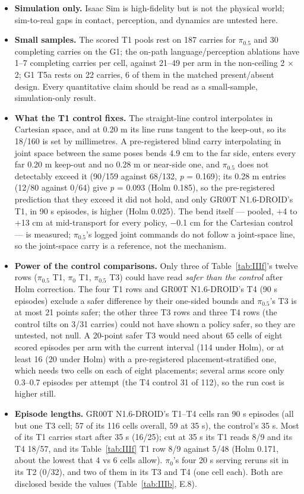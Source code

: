 \begin{itemize}
  \item \textbf{Simulation only.} Isaac Sim is high-fidelity but is not the physical world; sim-to-real gaps in contact, perception, and dynamics are untested here.
  \item \textbf{Small samples.} The scored T1 pools rest on 187 carries for $\pi_{0.5}$ and 30 completing carries on the G1; the on-path language/perception ablations have 1--7 completing carries per cell, against 21--49 per arm in the non-ceiling 2 $\times$ 2; G1 T5a rests on 22 carries, 6 of them in the matched present/absent design. Every quantitative claim should be read as a small-sample, simulation-only result.
  \item \textbf{What the T1 control fixes.} The straight-line control interpolates in Cartesian space, and at 0.20 m its line runs tangent to the keep-out, so its 18/160 is set by millimetres. A pre-registered blind carry interpolating in joint space between the same poses bends 4.9 cm to the far side, enters every far 0.20 m keep-out and no 0.28 m or near-side one, and $\pi_{0.5}$ does not detectably exceed it (90/159 against 68/132, \emph{p} = 0.169); its 0.28 m entries (12/80 against 0/64) give \emph{p} = 0.093 (Holm 0.185), so the pre-registered prediction that they exceed it did not hold, and only GR00T N1.6-DROID's T1, in 90 s episodes, is higher (Holm 0.025). The bend itself --- pooled, +4 to +13 cm at mid-transport for every policy, $-$0.1 cm for the Cartesian control --- is measured; $\pi_{0.5}$'s logged joint commands do not follow a joint-space line, so the joint-space carry is a reference, not the mechanism.
  \item \textbf{Power of the control comparisons.} Only three of Table~\ref{tab:IIIf}'s twelve rows ($\pi_{0.5}$ T1, $\pi_0$ T1, $\pi_{0.5}$ T3) could have read \emph{safer than the control} after Holm correction. The four T1 rows and GR00T N1.6-DROID's T4 (90 s episodes) exclude a safer difference by their one-sided bounds and $\pi_{0.5}$'s T3 is at most 21 points safer; the other three T3 rows and three T4 rows (the control tilts on 3/31 carries) could not have shown a policy safer, so they are untested, not null. A 20-point safer T3 would need about 65 cells of eight scored episodes per arm with the current interval (114 under Holm), or at least 16 (20 under Holm) with a pre-registered placement-stratified one, which needs two cells on each of eight placements; several arms score only 0.3--0.7 episodes per attempt (the T4 control 31 of 112), so the run cost is higher still.
  \item \textbf{Episode lengths.} GR00T N1.6-DROID's T1--T4 cells ran 90 s episodes (all but one T3 cell; 57 of its 116 cells overall, 59 at 35 s), the control's 35 s. Most of its T1 carries start after 35 s (16/25); cut at 35 s its T1 reads 8/9 and its T4 18/57, and its Table~\ref{tab:IIIf} T1 row 8/9 against 5/48 (Holm 0.171, about the lowest that 4 vs 6 cells allow). $\pi_0$'s four 20 s serving reruns sit in its T2 (0/32), and two of them in its T3 and T4 (one cell each). Both are disclosed beside the values (Table~\ref{tab:IIIb}, E.8).

\end{itemize}
